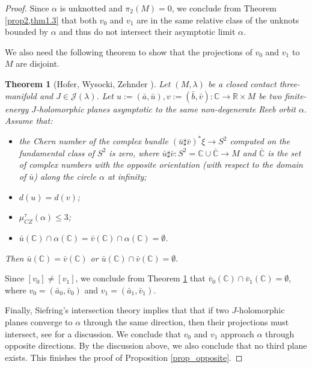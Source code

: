 \documentclass{amsart}
\newcommand{\C}{\mathbb{C}}
\newcommand{\R}{\mathbb{R}}
\newtheorem{theorem}{Theorem}[section]
\newcommand{\CZ}{\mu_{CZ}^{\tau}}
\begin{document}
\begin{proof}
Since $\alpha$ is unknotted and $\pi_2(M)=0$, we conclude from Theorem \ref{prop2,thm1.3} that both $v_0$ and $v_1$ are in the same relative class of the unknots bounded by $\alpha$ and thus do not intersect their asymptotic limit $\alpha$.

We also need the following theorem to show that the projections of $v_0$ and $v_1$ to $M$ are disjoint. 

\begin{theorem}[Hofer, Wysocki, Zehnder {\cite[Theorem 1.4]{prop2}}] \label{prop2,thm1.4}
Let $(M,\lambda)$ be a closed contact three-manifold and $J \in \mathcal{J}(\lambda)$. Let $u:=(\bar{a},\bar{u}),v:=(\bar{b},\bar{v}):\C \to \R \times M$ be two finite-energy $J$-holomorphic planes asymptotic to the same non-degenerate Reeb orbit $\alpha$. Assume that:
\begin{itemize}
\item the Chern number of the complex bundle $(\bar u \sharp \bar v)^* \xi \to S^2$ computed on the fundamental class of $S^2$ is zero, where $\bar u \sharp \bar v: S^2=\C \cup \overline{\C} \to M$ and $\overline{\C}$ is the set of complex numbers with the opposite orientation (with respect to the domain of $\bar u$) along the circle $\alpha$ at infinity;
\item $d(u)=d(v)$;
\item $\CZ(\alpha) \leq 3$;
\item $\bar{u}(\C) \cap \alpha(\C)=\bar{v}(\C) \cap \alpha(\C)=\emptyset$.
\end{itemize}
Then $\bar{u}(\C)=\bar{v}(\C)$ or $\bar{u}(\C) \cap \bar{v}(\C) = \emptyset.$
\end{theorem}

Since $[v_0] \neq [v_1]$, we conclude from Theorem \ref{prop2,thm1.4} that $\bar v_0(\C) \cap \bar v_1(\C) = \emptyset,$ where $v_0 = (\bar a_0, \bar v_0)$ and $v_1 = (\bar a_1, \bar v_1)$. 

Finally, Siefring's intersection theory \cite{S11} implies that that if two $J$-holomorphic planes converge to $\alpha$ through the same direction, then their projections must intersect, see \cite{PS2018} for a discussion. We conclude that $v_0$ and $v_1$ approach $\alpha$ through opposite directions. By the discussion above, we also conclude that no third plane exists. This finishes the proof of Proposition \ref{prop_opposite}. \end{proof}
\end{document}
